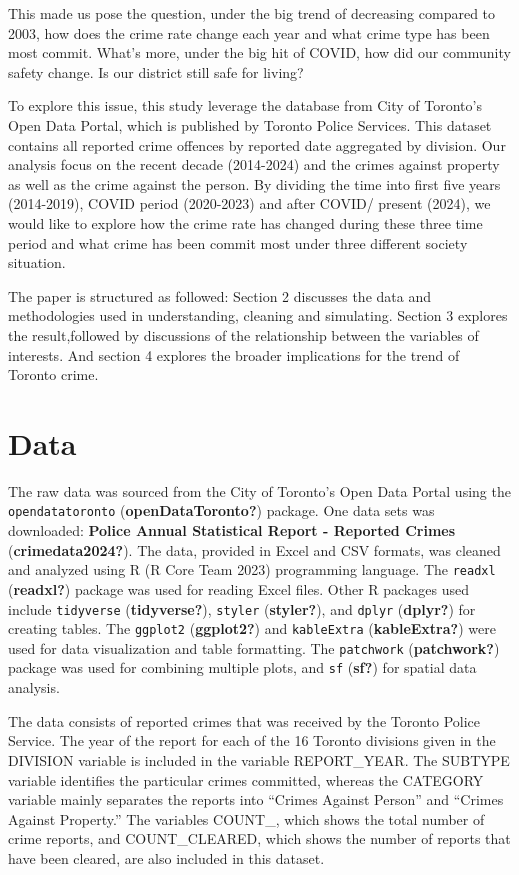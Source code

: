 \documentclass[
  letterpaper,
  DIV=11,
  numbers=noendperiod]{scrartcl}
\begin{document}
This made us pose the question, under the big trend of decreasing
compared to 2003, how does the crime rate change each year and what
crime type has been most commit. What's more, under the big hit of
COVID, how did our community safety change. Is our district still safe
for living?

To explore this issue, this study leverage the database from City of
Toronto's Open Data Portal, which is published by Toronto Police
Services. This dataset contains all reported crime offences by reported
date aggregated by division. Our analysis focus on the recent decade
(2014-2024) and the crimes against property as well as the crime against
the person. By dividing the time into first five years (2014-2019),
COVID period (2020-2023) and after COVID/ present (2024), we would like
to explore how the crime rate has changed during these three time period
and what crime has been commit most under three different society
situation.

The paper is structured as followed: Section 2 discusses the data and
methodologies used in understanding, cleaning and simulating. Section 3
explores the result,followed by discussions of the relationship between
the variables of interests. And section 4 explores the broader
implications for the trend of Toronto crime.

\hypertarget{sec-data}{%
\section{Data}\label{sec-data}}

The raw data was sourced from the City of Toronto's Open Data Portal
using the \texttt{opendatatoronto} (\textbf{openDataToronto?}) package.
One data sets was downloaded: \textbf{Police Annual Statistical Report -
Reported Crimes} (\textbf{crimedata2024?}). The data, provided in Excel
and CSV formats, was cleaned and analyzed using R (R Core Team 2023)
programming language. The \texttt{readxl} (\textbf{readxl?}) package was
used for reading Excel files. Other R packages used include
\texttt{tidyverse} (\textbf{tidyverse?}), \texttt{styler}
(\textbf{styler?}), and \texttt{dplyr} (\textbf{dplyr?}) for creating
tables. The \texttt{ggplot2} (\textbf{ggplot2?}) and \texttt{kableExtra}
(\textbf{kableExtra?}) were used for data visualization and table
formatting. The \texttt{patchwork} (\textbf{patchwork?}) package was
used for combining multiple plots, and \texttt{sf} (\textbf{sf?}) for
spatial data analysis.

The data consists of reported crimes that was received by the Toronto
Police Service. The year of the report for each of the 16 Toronto
divisions given in the DIVISION variable is included in the variable
REPORT\_YEAR. The SUBTYPE variable identifies the particular crimes
committed, whereas the CATEGORY variable mainly separates the reports
into ``Crimes Against Person'' and ``Crimes Against Property.'' The
variables COUNT\_, which shows the total number of crime reports, and
COUNT\_CLEARED, which shows the number of reports that have been
cleared, are also included in this dataset.
\end{document}

